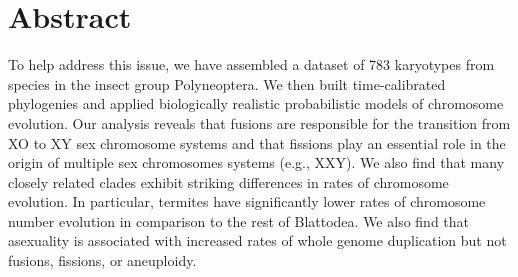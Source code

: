 \section{Abstract}
To help address this issue, we have assembled a dataset of 783 karyotypes from species in the insect group Polyneoptera. 
We then built time-calibrated phylogenies and applied biologically realistic probabilistic models of chromosome evolution.
Our analysis reveals that fusions are responsible for the transition from XO to XY sex chromosome systems and that fissions play an essential role in the origin of multiple sex chromosomes systems (e.g., XXY).
We also find that many closely related clades exhibit striking differences in rates of chromosome evolution.
In particular, termites have significantly lower rates of chromosome number evolution in comparison to the rest of Blattodea.
We also find that asexuality is associated with increased rates of whole genome duplication but not fusions, fissions, or aneuploidy.







